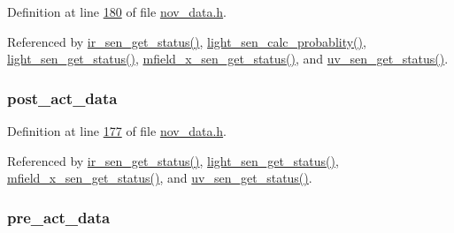 Definition at line \hyperlink{a00022_source_l00180}{180} of file \hyperlink{a00022_source}{nov\+\_\+data.\+h}.



Referenced by \hyperlink{a00045_source_l00302}{ir\+\_\+sen\+\_\+get\+\_\+status()}, \hyperlink{a00047_source_l00184}{light\+\_\+sen\+\_\+calc\+\_\+probablity()}, \hyperlink{a00047_source_l00204}{light\+\_\+sen\+\_\+get\+\_\+status()}, \hyperlink{a00050_source_l00276}{mfield\+\_\+x\+\_\+sen\+\_\+get\+\_\+status()}, and \hyperlink{a00073_source_l00302}{uv\+\_\+sen\+\_\+get\+\_\+status()}.

\hypertarget{a00028_a9c699c0cc82d0baa6e49195f185ab34f}{
\subsubsection[{post\+\_\+act\+\_\+data}]{ post\+\_\+act\+\_\+data}}\label{a00028_a9c699c0cc82d0baa6e49195f185ab34f}


Definition at line \hyperlink{a00022_source_l00177}{177} of file \hyperlink{a00022_source}{nov\+\_\+data.\+h}.



Referenced by \hyperlink{a00045_source_l00302}{ir\+\_\+sen\+\_\+get\+\_\+status()}, \hyperlink{a00047_source_l00204}{light\+\_\+sen\+\_\+get\+\_\+status()}, \hyperlink{a00050_source_l00276}{mfield\+\_\+x\+\_\+sen\+\_\+get\+\_\+status()}, and \hyperlink{a00073_source_l00302}{uv\+\_\+sen\+\_\+get\+\_\+status()}.

\hypertarget{a00028_aab01e8da056827bc5c9caff9b64c78be}{
\subsubsection[{pre\+\_\+act\+\_\+data}]{ pre\+\_\+act\+\_\+data}}\label{a00028_aab01e8da056827bc5c9caff9b64c78be}


